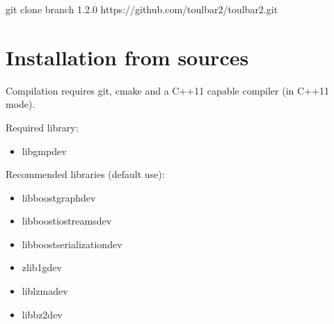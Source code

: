 \documentclass[letterpaper,10pt,openany,oneside,english]{sphinxmanual}
\begin{document}
\begin{sphinxVerbatim}[commandchars=\\\{\}]
git clone \PYGZhy{}\PYGZhy{}branch 1.2.0 https://github.com/toulbar2/toulbar2.git
\end{sphinxVerbatim}


\section{Installation from sources}
\label{\detokenize{_files/README:installation-from-sources}}\label{\detokenize{_files/README:readme-5}}
\sphinxAtStartPar
Compilation requires git, cmake and a C++\sphinxhyphen{}11 capable compiler (in C++11 mode).

\sphinxAtStartPar
Required library:
\begin{itemize}
\item {} 
\sphinxAtStartPar
libgmp\sphinxhyphen{}dev

\end{itemize}

\sphinxAtStartPar
Recommended libraries (default use):
\begin{itemize}
\item {} 
\sphinxAtStartPar
libboost\sphinxhyphen{}graph\sphinxhyphen{}dev

\item {} 
\sphinxAtStartPar
libboost\sphinxhyphen{}iostreams\sphinxhyphen{}dev

\item {} 
\sphinxAtStartPar
libboost\sphinxhyphen{}serialization\sphinxhyphen{}dev

\item {} 
\sphinxAtStartPar
zlib1g\sphinxhyphen{}dev

\item {} 
\sphinxAtStartPar
liblzma\sphinxhyphen{}dev

\item {} 
\sphinxAtStartPar
libbz2\sphinxhyphen{}dev

\end{itemize}
\end{document}
